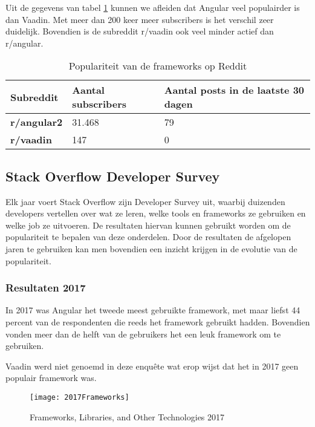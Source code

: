 Uit de gegevens van tabel \ref{table:reddit} kunnen we afleiden dat Angular veel populairder is dan Vaadin. Met meer dan 200 keer meer subscribers is het verschil zeer duidelijk. Bovendien is de subreddit r/vaadin ook veel minder actief dan r/angular.
\begin{table}[H]
	\begin{tabular}{|l|l|l|}
		\hline
		\textbf{Subreddit}  & \textbf{Aantal subscribers} & \textbf{Aantal posts in de laatste 30 dagen} \\ \hline
		\textbf{r/angular2} & 31.468                      & 79                                           \\ \hline
		\textbf{r/vaadin}   & 147                         & 0                                            \\ \hline
	\end{tabular}
	\caption{Populariteit van de frameworks op Reddit}
\label{table:reddit}
\end{table}

\subsection{Stack Overflow Developer Survey}
Elk jaar voert Stack Overflow zijn Developer Survey \autocite{DeveloperSurvey2019} uit, waarbij duizenden developers vertellen over wat ze leren, welke tools en frameworks ze gebruiken en welke job ze uitvoeren. De resultaten hiervan kunnen gebruikt worden om de populariteit te bepalen van deze onderdelen. Door de resultaten de afgelopen jaren te gebruiken kan men bovendien een inzicht krijgen in de evolutie van de populariteit.


\subsubsection{Resultaten 2017}
In 2017 was Angular het tweede meest gebruikte framework, met maar liefst 44 percent van de respondenten die reeds het framework gebruikt hadden. Bovendien vonden meer dan de helft van de gebruikers het een leuk framework om te gebruiken.

Vaadin werd niet genoemd in deze enquête wat erop wijst dat het in 2017 geen populair framework was.

\begin{figure}[H]
	\centering
	\texttt{[image: 2017Frameworks]}
	\caption{Frameworks, Libraries, and Other Technologies 2017 \autocite{DeveloperSurvey2017}}
	\label{fig:Frameworks, Libraries, and Other Technologies 2017}
\end{figure}

